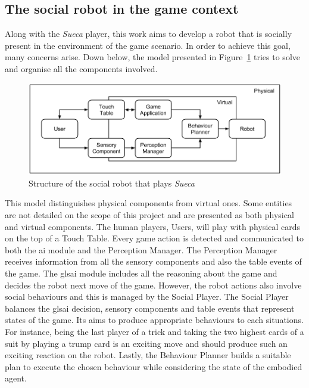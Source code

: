 \subsection{The social robot in the game context}
\label{sec:social_solution}

Along with the \emph{Sueca} player, this work aims to develop a robot that is socially present in the environment of the game scenario.
In order to achieve this goal, many concerns arise.
Down below, the model presented in Figure~\ref{fig:model} tries to solve and organise all the components involved.

\begin{figure}[h!]
  \centering
    \includegraphics[width=1\textwidth]{./img/model}
  \caption{Structure of the social robot that plays \emph{Sueca}}
\label{fig:model}
\end{figure}

This model distinguishes physical components from virtual ones.
Some entities are not detailed on the scope of this project and are presented as both physical and virtual components.
The human players, Users, will play with physical cards on the top of a Touch Table.
Every game action is detected and communicated to both the \gls{ai} module and the Perception Manager.
The Perception Manager receives information from all the sensory components and also the table events of the game.
The gls{ai} module includes all the reasoning about the game and decides the robot next move of the game.
However, the robot actions also involve social behaviours and this is managed by the Social Player.
The Social Player balances the gls{ai} decision, sensory components and table events that represent states of the game.
Its aims to produce appropriate behaviours to each situations.
For instance, being the last player of a trick and taking the two highest cards of a suit by playing a trump card is an exciting move and should produce such an exciting reaction on the robot.
Lastly, the Behaviour Planner builds a suitable plan to execute the chosen behaviour while considering the state of the embodied agent.

